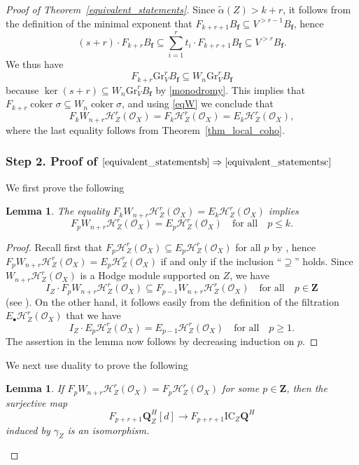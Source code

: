 \documentclass[11pt]{article}
\numberwithin{equation}{section}
\newcommand{\sbullet}{{\scriptscriptstyle\bullet}}
\theoremstyle{plain}
\newtheorem{lem}[thm]{Lemma}
\theoremstyle{definition}
\newcommand\Z{{\mathbf Z}}
\newcommand\Q{{\mathbf Q}}
\newcommand\cH{\mathcal{H}}
\newcommand\cO{\mathcal{O}}
\newcommand\cH{\mathcal{H}}
\newcommand\cO{\mathcal{O}}
\newcommand\bff{{\boldsymbol f}}
\newcommand\gr{\mathrm{Gr}}
\DeclareMathOperator{\coker}{coker}
\begin{document}
\begin{proof}[Proof of Theorem~\ref{equivalent_statements}]
Since $\widetilde\alpha(Z)>k+r$, it follows from the definition of the minimal exponent that
$F_{k+r+1}B_\bff\subseteq V^{>r-1}B_\bff$, hence
\[
(s+r)\cdot F_{k+r}B_\bff \subseteq \sum^r_{i=1} t_i \cdot F_{k+r+1} B_\bff \subseteq V^{>r} B_\bff.
\]
We thus have
\begin{equation}\label{eq:ab2}
F_{k+r}\gr^r_V B_\bff \subseteq W_n\gr^r_V B_\bff
\end{equation}
because $\ker(s+r)\subseteq W_n\gr^r_VB_\bff$ by \eqref{monodromy}.
This implies that $F_{k+r}\coker\sigma\subseteq W_n\coker \sigma$, and using \eqref{eqW}
we conclude that
\[F_kW_{n+r}\cH^r_Z(\cO_X)=F_k\cH_Z^r(\cO_X)=E_k\cH^r_Z(\cO_X),\]
where the last equality follows from Theorem~\ref{thm_local_coho}.

\subsubsection*{Step 2. Proof of $\eqref{equivalent_statementsb}\Rightarrow\eqref{equivalent_statementsc}$}
We first prove the following

\begin{lem}\label{lem:6}
The equality $F_k W_{n+r}\cH^r_Z(\cO_X)=E_k \cH^r_Z(\cO_X)$ implies
\[
F_p W_{n+r}\cH^r_Z(\cO_X)=E_p \cH^r_Z(\cO_X) \quad \text{for all} \quad p\leq k.
\]
\end{lem}

\begin{proof}
Recall first that $F_p\cH^r_Z(\cO_X)\subseteq E_p\cH^r_Z(\cO_X)$ for all $p$ by \cite[Prop.\,3.4]{MP1},
hence $F_p W_{n+r}\cH^r_Z(\cO_X)=E_p \cH^r_Z(\cO_X)$ if and only if the inclusion ``$\supseteq$'' holds.
Since $W_{n+r}\cH^r_Z(\cO_X)$ is a Hodge module supported on $Z$, we have
\[
I_Z \cdot F_p W_{n+r}\cH^r_Z(\cO_X) \subseteq F_{p-1} W_{n+r}\cH^r_Z(\cO_X)\quad\text{for all}\quad p\in\Z
\]
(see \cite[Lem.\,3.2.6]{Saito_MHP}).
On the other hand, it follows easily from the definition of the filtration $E_{\sbullet}\cH_Z^r(\cO_X)$ that we have
\[
I_Z\cdot E_p\cH^r_Z(\cO_X)=E_{p-1}\cH^r_Z(\cO_X)\quad\text{for all}\quad p\geq 1.
\]
The assertion in the lemma now follows by decreasing induction on $p$.
\end{proof}

We next use duality to prove the following

\begin{lem}\label{lem:dualfw}
If $F_pW_{n+r}\cH^r_Z(\cO_X)=F_p \cH^r_Z(\cO_X)$ for some $p\in \Z$, then the surjective map
\[
F_{p+r+1}\Q_Z^H[d] \to F_{p+r+1}\mathrm{IC}_Z\Q^H
\]
induced by $\gamma_Z$ is an isomorphism.
\end{lem}


\end{proof}
\end{document}
